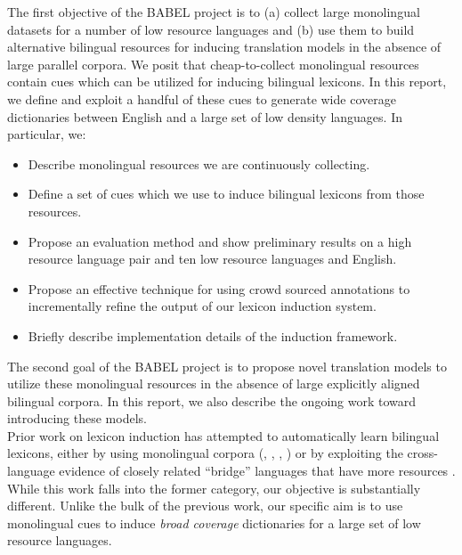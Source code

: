 \documentclass{article}
\begin{document}
The first objective of the BABEL project is to (a) collect large monolingual datasets for a number of low resource languages and (b) use them to build alternative bilingual resources for inducing translation models in the absence of large parallel corpora.  We posit that cheap-to-collect monolingual resources contain cues which can be utilized for inducing bilingual lexicons. In this report, we define and exploit a handful of these cues to generate wide coverage dictionaries between English and a large set of low density languages. In particular, we:

\begin{itemize}
 \item Describe monolingual resources we are continuously collecting.
 \item Define a set of cues which we use to induce bilingual lexicons from those resources.
 \item Propose an evaluation method and show preliminary results on a high resource language pair and ten low resource languages and English.
 \item Propose an effective technique for using crowd sourced annotations to incrementally refine the output of our lexicon induction system.
 \item Briefly describe implementation details of the induction framework.
\end{itemize}

The second goal of the BABEL project is to propose novel translation models to utilize these monolingual resources in the absence of large explicitly aligned bilingual corpora.  In this report, we also describe the ongoing work toward introducing these models.\\

Prior work on lexicon induction has attempted to automatically learn bilingual lexicons, either by using monolingual corpora (\cite{Rapp:1999}, \cite{Koehn:2002}, \cite{Schafer:2002}, \cite{Haghighi:2008}) or by exploiting the cross-language evidence of closely related “bridge” languages that have more resources \cite{Mann:2001}.  While this work falls into the former category, our objective is substantially different.  Unlike the bulk of the previous work, our specific aim is to use monolingual cues to induce {\em broad coverage} dictionaries for a large set of low resource languages. 
\end{document}
